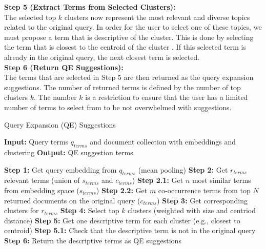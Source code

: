 \textbf{Step 5 (Extract Terms from Selected Clusters):}\\
The selected top $k$ clusters now represent the most relevant and diverse topics related to the original query. In order for the user to select one of these topics, we must propose a term that is descriptive of the cluster. This is done by selecting the term that is closest to the centroid of the cluster \cite{rossiello2017centroid, khennak2019clustering}. If this selected term is already in the original query, the next closest term is selected.\\


\textbf{Step 6 (Return QE Suggestions):}\\
The terms that are selected in Step 5 are then returned as the query expansion suggestions. The number of returned terms is defined by the number of top clusters $k$. The number $k$ is a restriction to ensure that the user has a limited number of terms to select from to be not overwhelmed with suggestions.
\begin{algorithm}
    \caption{Query Expansion (QE) Suggestions}
    \label{alg:qe}
    \begin{algorithmic}[1]
        \State \textbf{Input:} Query terms $q_{terms}$ and document collection with embeddings and clustering
        \State \textbf{Output:} QE suggestion terms
        \State
        
        \State \textbf{Step 1:} Get query embedding from $q_{terms}$ (mean pooling)
        \State \textbf{Step 2:} Get $r_{terms}$ relevant terms (union of $s_{terms}$ and $c_{terms}$)
        \State \quad \textbf{Step 2.1:} \hspace*{0.01cm} Get $n$ most similar terms from embedding space ($s_{terms}$)
        \State \quad \textbf{Step 2.2:} Get $m$ co-occurrence terms from top $N$ returned documents on the \hspace*{2.5cm} original query ($c_{terms}$)
        \State \textbf{Step 3:} Get corresponding clusters for $r_{terms}$
        \State \textbf{Step 4:} Select top $k$ clusters (weighted with size and centriod distance)
        \State \textbf{Step 5:} Get one descriptive term for each cluster (e.g., closest to centroid)
        \State \quad \textbf{Step 5.1:} Check that the descriptive term is not in the original query
        \State \textbf{Step 6:} Return the descriptive terms as QE suggestions
    \end{algorithmic}
\end{algorithm}

